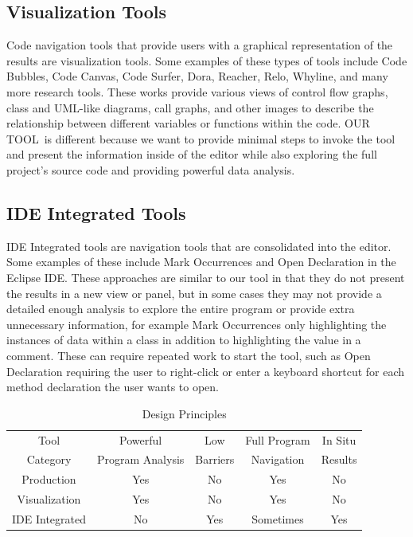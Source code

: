 \documentclass[conference]{IEEEtran}
\newcommand{\toolName}{OUR TOOL}
\begin{document}
\subsection{Visualization Tools}
Code navigation tools that provide users with a graphical representation of the results are visualization tools. Some examples of these types of tools include Code Bubbles\cite{CodeBubbles}, Code Canvas\cite{CodeCanvas}, Code Surfer\cite{CodeSurfer}, Dora\cite{Dora}, Reacher\cite{Reacher}, Relo\cite{Relo}, Whyline\cite{Whyline}, and many more research tools. These works provide various views of control flow graphs, class and UML-like diagrams, call graphs, and other images to describe the relationship between different variables or functions within the code. \toolName~is different because we want to provide minimal steps to invoke the tool and present the information inside of the editor while also exploring the full project's source code and providing powerful data analysis.

\subsection{IDE Integrated Tools}
IDE Integrated tools are navigation tools that are consolidated into the editor. Some examples of these include Mark Occurrences\cite{MarkOccurrences} and Open Declaration in the Eclipse IDE. These approaches are similar to our tool in that they do not present the results in a new view or panel, but in some cases they may not provide a detailed enough analysis to explore the entire program or provide extra unnecessary information, for example Mark Occurrences only highlighting the instances of data within a class in addition to highlighting the value in a comment. These can require repeated work to start the tool, such as Open Declaration requiring the user to right-click or enter a keyboard shortcut for each method declaration the user wants to open.

\begin{table}
	\centering
	\caption{Design Principles}
	\begin{tabular}{|c|c|c|c|c|}
		\hline
		Tool & Powerful & Low & Full Program & In Situ\\
		Category & Program Analysis & Barriers & Navigation & Results\\
		\hline
		Production & Yes & No & Yes & No\\
		\hline
		Visualization & Yes & No & Yes & No \\
		\hline
		IDE Integrated & No & Yes & Sometimes & Yes \\
		\hline
	\end{tabular}
	\label{table:background}
\end{table}
\end{document}
